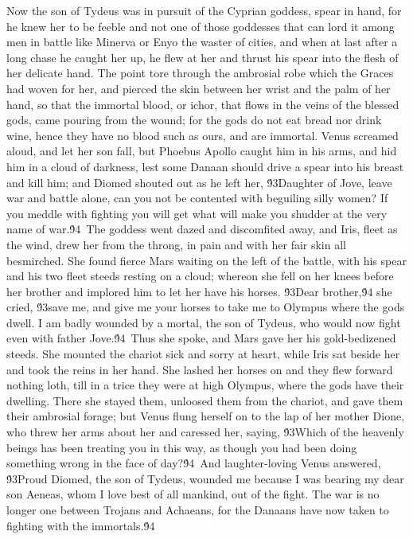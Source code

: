 {Now the son of Tydeus was in pursuit of the Cyprian goddess, spear in hand, for he knew her to be feeble and not one of those goddesses that can lord it among men in battle like Minerva or Enyo the waster of cities, and when at last after a long chase he caught her up, he flew at her and thrust his spear into the flesh of her delicate hand. The point tore through the ambrosial robe which the Graces had woven for her, and pierced the skin between her wrist and the palm of her hand, so that the immortal blood, or ichor, that flows in the veins of the blessed gods, came pouring from the wound; for the gods do not eat bread nor drink wine, hence they have no blood such as ours, and are immortal. Venus screamed aloud, and let her son fall, but Phoebus Apollo caught him in his arms, and hid him in a cloud of darkness, lest some Danaan should drive a spear into his breast and kill him; and Diomed shouted out as he left her, \'93Daughter of Jove, leave war and battle alone, can you not be contented with beguiling silly women? If you meddle with fighting you will get what will make you shudder at the very name of war.\'94\
The goddess went dazed and discomfited away, and Iris, fleet as the wind, drew her from the throng, in pain and with her fair skin all besmirched. She found fierce Mars waiting on the left of the battle, with his spear and his two fleet steeds resting on a cloud; whereon she fell on her knees before her brother and implored him to let her have his horses. \'93Dear brother,\'94 she cried, \'93save me, and give me your horses to take me to Olympus where the gods dwell. I am badly wounded by a mortal, the son of Tydeus, who would now fight even with father Jove.\'94\
Thus she spoke, and Mars gave her his gold-bedizened steeds. She mounted the chariot sick and sorry at heart, while Iris sat beside her and took the reins in her hand. She lashed her horses on and they flew forward nothing loth, till in a trice they were at high Olympus, where the gods have their dwelling. There she stayed them, unloosed them from the chariot, and gave them their ambrosial forage; but Venus flung herself on to the lap of her mother Dione, who threw her arms about her and caressed her, saying, \'93Which of the heavenly beings has been treating you in this way, as though you had been doing something wrong in the face of day?\'94\
And laughter-loving Venus answered, \'93Proud Diomed, the son of Tydeus, wounded me because I was bearing my dear son Aeneas, whom I love best of all mankind, out of the fight. The war is no longer one between Trojans and Achaeans, for the Danaans have now taken to fighting with the immortals.\'94\
}
